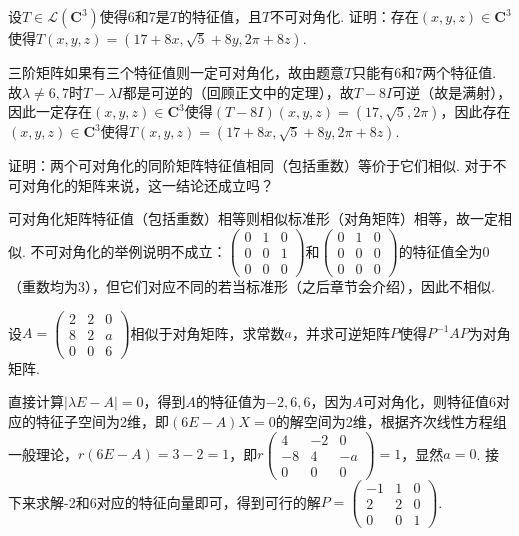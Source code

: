 \begin{exercise}
\begin{exgroup}
        \item 设$T\in \mathcal{L}(\mathbf{C}^3)$使得6和7是$T$的特征值，且$T$不可对角化. 证明：存在$(x,y,z)\in\mathbf{C}^3$使得$T(x,y,z)=(17+8x,\sqrt{5}+8y,2\pi+8z)$.
        \begin{answer}
            三阶矩阵如果有三个特征值则一定可对角化，故由题意$T$只能有6和7两个特征值. 故$\lambda\neq 6,7$时$T-\lambda I$都是可逆的（回顾正文中的定理），故$T-8I$可逆（故是满射），因此一定存在$(x,y,z)\in\mathbf{C}^3$使得$(T-8I)(x,y,z)=(17,\sqrt{5},2\pi)$，因此存在$(x,y,z)\in\mathbf{C}^3$使得$T(x,y,z)=(17+8x,\sqrt{5}+8y,2\pi+8z)$.
        \end{answer}

        \item 证明：两个可对角化的同阶矩阵特征值相同（包括重数）等价于它们相似. 对于不可对角化的矩阵来说，这一结论还成立吗？
        \begin{answer}
            可对角化矩阵特征值（包括重数）相等则相似标准形（对角矩阵）相等，故一定相似. 不可对角化的举例说明不成立：$\begin{pmatrix}
                0 & 1 & 0 \\ 0 & 0 & 1 \\ 0 & 0 & 0
            \end{pmatrix}$和$\begin{pmatrix}
                0 & 1 & 0 \\ 0 & 0 & 0 \\ 0 & 0 & 0
            \end{pmatrix}$的特征值全为0（重数均为3），但它们对应不同的若当标准形（之后章节会介绍），因此不相似.
        \end{answer}

        \item 设$A=\begin{pmatrix}
                2 & 2 & 0 \\ 8 & 2 & a \\ 0 & 0 & 6
            \end{pmatrix}$相似于对角矩阵，求常数$a$，并求可逆矩阵$P$使得$P^{-1}AP$为对角矩阵.
        \begin{answer}
            直接计算$|\lambda E-A|=0$，得到$A$的特征值为$-2,6,6$，因为$A$可对角化，则特征值6对应的特征子空间为2维，即$(6E-A)X=0$的解空间为2维，根据齐次线性方程组一般理论，$r(6E-A)=3-2=1$，即$r\begin{pmatrix}
                4 & -2 & 0 \\ -8 & 4 & -a \\ 0 & 0 & 0
            \end{pmatrix}=1$，显然$a=0$. 接下来求解-2和6对应的特征向量即可，得到可行的解$P=\begin{pmatrix}
                -1 & 1 & 0 \\ 2 & 2 & 0 \\ 0 & 0 & 1
            \end{pmatrix}$.
        \end{answer}


\end{exgroup}
\end{exercise}
